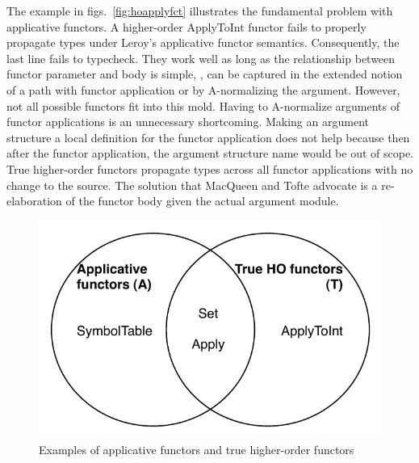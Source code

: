 The example in figs.~\ref{fig:hoapplyfct} illustrates the fundamental problem with applicative functors. A higher-order ApplyToInt functor fails to properly propagate types under Leroy's applicative functor semantics. Consequently, the last line fails to typecheck. They work well as long as the relationship between functor parameter and body is simple, \ie, can be captured in the extended notion of a path with functor application or by A-normalizing the argument. However, not all possible functors fit into this mold. Having to A-normalize arguments of functor applications is an unnecessary shortcoming. Making an argument structure a local definition for the functor application does not help because then after the functor application, the argument structure name would be out of scope. True higher-order functors propagate types across all functor applications with no change to the source. The solution that MacQueen and Tofte \cite{mt94} advocate is a re-elaboration of the functor body given the actual argument module.

 \begin{figure}
\begin{center}
 \includegraphics[scale=0.5]{../design/figs/appandtruetypeprogvenn.pdf}
\end{center}
 \caption{Examples of applicative functors and true higher-order functors}
 \label{fig:appandtruetypeprogvenn}
 \end{figure}


